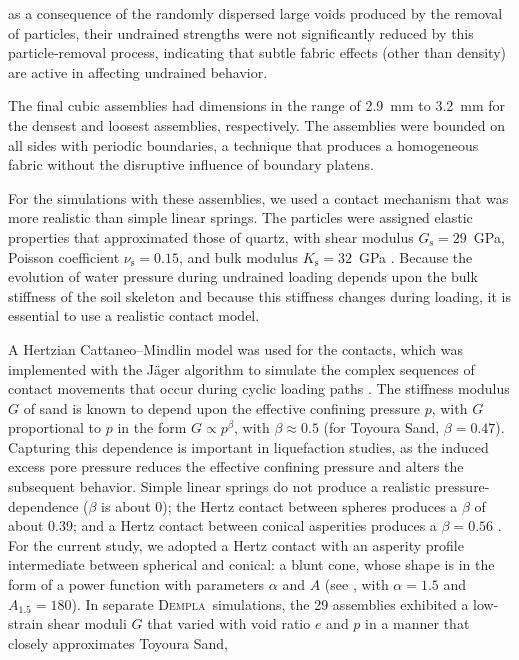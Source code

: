 \documentclass[letterpaper,11pt]{article}
\newcommand{\Dempla}{\textsc{Dempla}}
\begin{document}
as a consequence of the randomly dispersed large voids produced by the
removal of particles,
their undrained strengths were not significantly reduced by this
particle-removal process,
indicating that subtle fabric effects (other than density) are
active in affecting undrained behavior.
\par
The final cubic assemblies had dimensions in the range of 2.9~mm to 3.2~mm
for the densest and loosest assemblies, respectively.
The assemblies were bounded on all sides with
periodic boundaries, a technique that produces a homogeneous fabric without
the disruptive influence of boundary platens.
\par 
For the simulations with these assemblies,
we used a contact mechanism
that was more realistic than simple linear springs.
The particles were assigned elastic properties that
approximated those of quartz,
with shear modulus $G_{\text{s}}=29$~GPa,
Poisson coefficient $\nu_{\text{s}}=0.15$,
and bulk modulus $K_{\text{s}}=32$~GPa \citep{Pabst:2013a}.
Because the evolution of water pressure during undrained
loading depends upon the bulk stiffness of the soil skeleton
and because this stiffness changes during loading,
it is essential to use a realistic contact model.
\par
A Hertzian Cattaneo--Mindlin model was used for the contacts,
which was implemented with the J\"{a}ger algorithm
to simulate the complex sequences of contact movements that
occur during cyclic loading paths \citep{Kuhn:2011a}.
The stiffness modulus $G$ of sand is known to depend upon
the effective confining pressure $p$, with $G$ proportional
to $p$ in the form $G\propto p^{\beta}$, with $\beta\approx 0.5$
(for Toyoura Sand, $\beta=0.47$).
Capturing this dependence is important in liquefaction studies,
as the induced excess pore pressure reduces the effective confining pressure
and alters the subsequent behavior.
Simple linear springs do not produce a realistic pressure-dependence
($\beta$ is about 0); the Hertz contact between spheres produces
a $\beta$ of about 0.39; and a Hertz contact between conical
asperities produces a $\beta=0.56$ \citep{Kuhn:2014c}.
For the current study, we adopted a Hertz contact with an
asperity profile intermediate between spherical and conical:
a blunt cone, whose shape is in the form of a power function
with parameters $\alpha$ and $A$
(see \citet{Kuhn:2014c}, with $\alpha=1.5$ and $A_{1.5}=180$).
%
In separate \Dempla\ simulations,
the 29 assemblies exhibited a low-strain shear moduli $G$
that varied with void ratio $e$ and %
$p$ in a manner that closely approximates Toyoura Sand,
\end{document}
